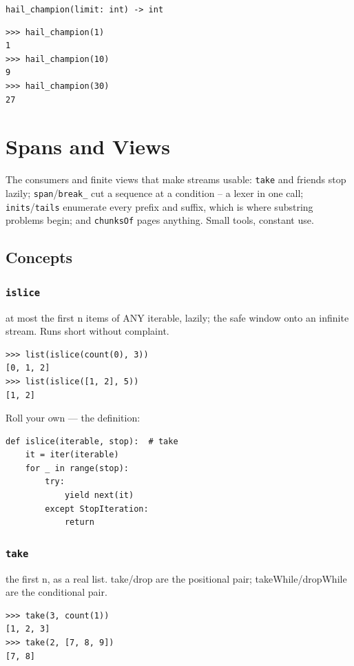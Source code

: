 \documentclass[10pt,letterpaper]{book}
\begin{document}
\noindent\texttt{hail\_champion(limit: int) -> int}
\begin{lstlisting}[style=ex]
>>> hail_champion(1)
1
>>> hail_champion(10)
9
>>> hail_champion(30)
27
\end{lstlisting}
\clearpage
\chapter{Spans and Views}

The consumers and finite views that make streams usable: \texttt{take} and
friends stop lazily; \texttt{span}/\texttt{break\_} cut a sequence at a
condition -- a lexer in one call; \texttt{inits}/\texttt{tails} enumerate
every prefix and suffix, which is where substring problems begin; and
\texttt{chunksOf} pages anything. Small tools, constant use.
\section{Concepts}
\subsection{\texttt{islice}}\label{def:islice}
at most the first n items of ANY iterable, lazily; the safe window onto an infinite stream. Runs short without complaint.
\begin{lstlisting}[style=ex]
>>> list(islice(count(0), 3))
[0, 1, 2]
>>> list(islice([1, 2], 5))
[1, 2]
\end{lstlisting}

Roll your own --- the definition:

\begin{lstlisting}[style=ex]
def islice(iterable, stop):  # take
    it = iter(iterable)
    for _ in range(stop):
        try:
            yield next(it)
        except StopIteration:
            return
\end{lstlisting}

\subsection{\texttt{take}}\label{def:take}
the first n, as a real list. take/drop are the positional pair; takeWhile/dropWhile are the conditional pair.
\begin{lstlisting}[style=ex]
>>> take(3, count(1))
[1, 2, 3]
>>> take(2, [7, 8, 9])
[7, 8]
\end{lstlisting}
\end{document}
